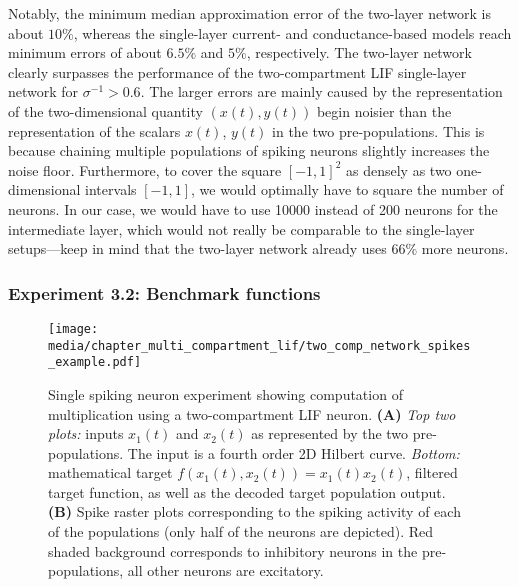 Notably, the minimum median approximation error of the two-layer network is about $10\%$, whereas the single-layer current- and conductance-based models reach minimum errors of about $6.5\%$ and $5\%$, respectively. The two-layer network clearly surpasses the performance of the two-compartment LIF single-layer network for $\sigma^{-1} > 0.6$.
The larger errors are mainly caused by the representation of the two-dimensional quantity $(x(t), y(t))$ begin noisier than the representation of the scalars $x(t)$, $y(t)$ in the two pre-populations. This is because chaining multiple populations of spiking neurons slightly increases the noise floor. Furthermore, to cover the square $[-1, 1]^2$ as densely as two one-dimensional intervals $[-1, 1]$, we would optimally have to square the number of neurons. In our case, we would have to use \num{10000} instead of \num{200} neurons for the intermediate layer, which would not really be comparable to the single-layer setups---keep in mind that the two-layer network already uses $66\%$ more neurons.



\subsubsection*{Experiment 3.2: Benchmark functions}

\begin{figure}
	\texttt{[image: media/chapter\_multi\_compartment\_lif/two\_comp\_network\_spikes\_example.pdf]}
	\caption[Single spiking neuron experiment showing computation of multiplication using a two-compartment LIF neuron.]{Single spiking neuron experiment showing computation of multiplication using a two-compartment LIF neuron.
	\textbf{(A)} \emph{Top two plots:} inputs $x_1(t)$ and $x_2(t)$ as represented by the two pre-populations. The input is a fourth order 2D Hilbert curve. \emph{Bottom:} mathematical target $f(x_1(t), x_2(t)) = x_1(t) x_2(t)$, filtered target function, as well as the decoded target population output.
	\textbf{(B)} Spike raster plots corresponding to the spiking activity of each of the populations (only half of the neurons are depicted). Red shaded background corresponds to inhibitory neurons in the pre-populations, all other neurons are excitatory.}
	\label{fig:spiking_example}
\end{figure}

